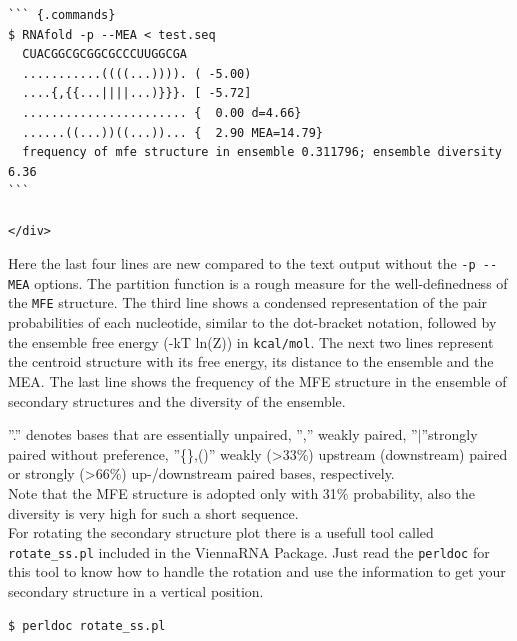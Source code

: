 \documentclass[]{article}
\begin{document}
\begin{verbatim}
``` {.commands}
$ RNAfold -p --MEA < test.seq
  CUACGGCGCGGCGCCCUUGGCGA
  ...........((((...)))). ( -5.00)
  ....{,{{...||||...)}}}. [ -5.72]
  ....................... {  0.00 d=4.66}
  ......((...))((...))... {  2.90 MEA=14.79}
  frequency of mfe structure in ensemble 0.311796; ensemble diversity 6.36
```

</div>
\end{verbatim}

Here the last four lines are new compared to the text output without the
\texttt{-p\ -\/-MEA} options. The partition function is a rough measure
for the well-definedness of the \texttt{MFE} structure. The third line
shows a condensed representation of the pair probabilities of each
nucleotide, similar to the dot-bracket notation, followed by the
ensemble free energy (-kT ln(Z)) in \texttt{kcal/mol}. The next two
lines represent the centroid structure with its free energy, its
distance to the ensemble and the MEA. The last line shows the frequency
of the MFE structure in the ensemble of secondary structures and the
diversity of the ensemble.

''.'' denotes bases that are essentially unpaired, '','' weakly paired,
''\(|\)''strongly paired without preference, ''\{\},()'' weakly
(\textgreater{}33\%) upstream (downstream) paired or strongly (\textgreater{}66\%)
up-/downstream paired bases, respectively.\\
 Note that the MFE structure is adopted only with 31\% probability, also
the diversity is very high for such a short sequence.\\
 For rotating the secondary structure plot there is a usefull tool
called \texttt{rotate\_ss.pl} included in the ViennaRNA Package. Just
read the \texttt{perldoc} for this tool to know how to handle the
rotation and use the information to get your secondary structure in a
vertical position.

\begin{verbatim}
$ perldoc rotate_ss.pl
\end{verbatim}
\end{document}
